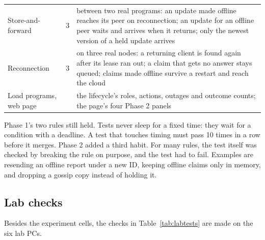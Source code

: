 \begin{table}[!htb]
\begin{tabularx}{\linewidth}{@{}P{3.6cm}rL@{}}
Store-and-forward & 3 & between two real programs: an update made offline reaches its peer on reconnection; an update for an offline peer waits and arrives when it returns; only the newest version of a held update arrives \\ %
Reconnection & 3 & on three real nodes: a returning client is found again after its lease ran out; a claim that gets no answer stays queued; claims made offline survive a restart and reach the cloud \\ %
Load programs, web page & \tbd{} & the lifecycle's roles, actions, outages and outcome counts; the page's four Phase 2 panels \\ %
\bottomrule
\end{tabularx}
\end{table}

Phase 1's two rules still held. Tests never sleep for a fixed time: they wait for a condition with a deadline. A test that touches timing must pass 10 times in a row before it merges. Phase 2 added a third habit. For many rules, the test itself was checked by breaking the rule on purpose, and the test had to fail. Examples are resending an offline report under a new ID, keeping offline claims only in memory, and dropping a gossip copy instead of holding it.

\subsection{Lab checks}
\label{sec:labchecks}

Besides the experiment cells, the checks in Table~\ref{tab:labtests} are made on the six lab PCs.

